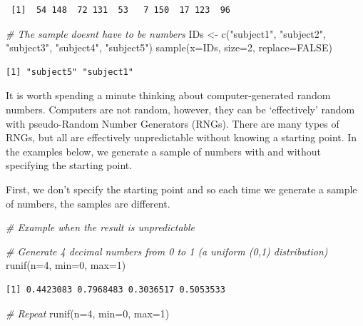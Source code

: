\documentclass[
  oneside]{krantz}
\newenvironment{Shaded}{\begin{snugshade}}{\end{snugshade}}
\newcommand{\AttributeTok}[1]{\textcolor[rgb]{0.77,0.63,0.00}{#1}}
\newcommand{\CommentTok}[1]{\textcolor[rgb]{0.56,0.35,0.01}{\textit{#1}}}
\newcommand{\ConstantTok}[1]{\textcolor[rgb]{0.00,0.00,0.00}{#1}}
\newcommand{\DecValTok}[1]{\textcolor[rgb]{0.00,0.00,0.81}{#1}}
\newcommand{\FunctionTok}[1]{\textcolor[rgb]{0.00,0.00,0.00}{#1}}
\newcommand{\NormalTok}[1]{#1}
\newcommand{\OtherTok}[1]{\textcolor[rgb]{0.56,0.35,0.01}{#1}}
\newcommand{\StringTok}[1]{\textcolor[rgb]{0.31,0.60,0.02}{#1}}
\begin{document}
\begin{verbatim}
 [1]  54 148  72 131  53   7 150  17 123  96
\end{verbatim}

\begin{Shaded}
\begin{Highlighting}[]
\CommentTok{\# The sample doesn\textquotesingle{}t have to be numbers}
\NormalTok{IDs }\OtherTok{\textless{}{-}} \FunctionTok{c}\NormalTok{(}\StringTok{"subject1"}\NormalTok{, }\StringTok{"subject2"}\NormalTok{, }\StringTok{"subject3"}\NormalTok{, }\StringTok{"subject4"}\NormalTok{, }\StringTok{"subject5"}\NormalTok{)}
\FunctionTok{sample}\NormalTok{(}\AttributeTok{x=}\NormalTok{IDs, }\AttributeTok{size=}\DecValTok{2}\NormalTok{, }\AttributeTok{replace=}\ConstantTok{FALSE}\NormalTok{)}
\end{Highlighting}
\end{Shaded}

\begin{verbatim}
[1] "subject5" "subject1"
\end{verbatim}

It is worth spending a minute thinking about computer-generated random numbers. Computers are not random, however, they can be `effectively' random with pseudo-Random Number Generators (RNGs). There are many types of RNGs, but all are effectively unpredictable without knowing a starting point. In the examples below, we generate a sample of numbers with and without specifying the starting point.

First, we don't specify the starting point and so each time we generate a sample of numbers, the samples are different.

\begin{Shaded}
\begin{Highlighting}[]
\CommentTok{\# Example when the result is unpredictable}

\CommentTok{\# Generate 4 decimal numbers from 0 to 1 (a uniform (0,1) distribution) }
\FunctionTok{runif}\NormalTok{(}\AttributeTok{n=}\DecValTok{4}\NormalTok{, }\AttributeTok{min=}\DecValTok{0}\NormalTok{, }\AttributeTok{max=}\DecValTok{1}\NormalTok{)}
\end{Highlighting}
\end{Shaded}

\begin{verbatim}
[1] 0.4423083 0.7968483 0.3036517 0.5053533
\end{verbatim}

\begin{Shaded}
\begin{Highlighting}[]
\CommentTok{\# Repeat}
\FunctionTok{runif}\NormalTok{(}\AttributeTok{n=}\DecValTok{4}\NormalTok{, }\AttributeTok{min=}\DecValTok{0}\NormalTok{, }\AttributeTok{max=}\DecValTok{1}\NormalTok{)}
\end{Highlighting}
\end{Shaded}
\end{document}
